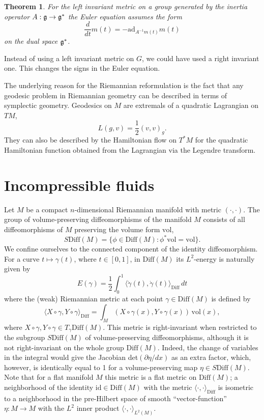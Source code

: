 \documentclass{article}
\theoremstyle{plain}
\newtheorem{teo}{Theorem}[section]
\theoremstyle{definition}
\newcommand{\Diff}{\ensuremath{\mathrm{Diff}}}
\newcommand{\Vol}{\ensuremath{\mathrm{vol}}}
\newcommand{\id}{\ensuremath{\mathrm{id}}}
\newcommand{\ad}{\ensuremath{\mathrm{ad}}}
\newcommand{\mf}{\ensuremath{\mathfrak}}
\begin{document}
\begin{teo}
For the left invariant metric on a group  generated by the inertia operator $A:\mf g\to \mf g^*$ the Euler equation assumes the form
\[
\frac{d}{dt}m(t)=-\ad_{A^{-1}m(t)}m(t)
\]
on the dual space $\mf g^*$.
\end{teo}

Instead of using a left invariant metric on $G$, we could have
used a right invariant one. This changes the signs in the Euler equation.

The underlying reason for the Riemannian reformulation is
the fact that any geodesic problem in Riemannian geometry can be described
in terms of symplectic geometry. Geodesics on $M$ are extremals of a quadratic
Lagrangian on $TM$,
\[
L(g,v)=\frac{1}{2}(v,v)_g.
\]
They can also be described by the Hamiltonian flow on $T^*M$ for the quadratic Hamiltonian function obtained from the Lagrangian via the Legendre transform.

\section{Incompressible fluids}
Let $M$ be a compact $n$-dimensional Riemannian manifold with metric $(\cdot,\cdot)$. The group of volume-preserving diffeomorphisms of the manifold $M$ consists of all diffeomorphisms of $M$ preserving the volume form $\Vol$,
\[
S\Diff(M)=\{\phi\in\Diff(M): \phi^*\Vol=\Vol\}.
\]
We confine ourselves to the connected component of the identity diffeomorphism. For a curve $t\mapsto \gamma(t)$, where $t\in[0,1]$, in $\Diff(M)$ its $L^2$-energy is naturally given by
\[
  E(\gamma)=\frac{1}{2}\int_0^1\langle \dot{\gamma}(t),\dot{\gamma}(t)\rangle_\Diff\,dt
\]
where the (weak) Riemannian metric at each point $\gamma\in\Diff(M)$ is defined by
%
\begin{equation}
\label{eq:weakmetric}
\langle X\circ \gamma,Y\circ \gamma\rangle_\Diff = \int_M(X\circ \gamma(x),Y\circ \gamma(x))\,\Vol(x),
\end{equation}
%
where $X\circ\gamma,Y\circ\gamma\in T_\gamma\Diff(M)$.
This metric is right-invariant when restricted to the subgroup $S\Diff(M)$ of
volume-preserving diffeomorphisms, although it is not right-invariant on the
whole group $\Diff(M)$. Indeed, the change of variables in the integral
would give the Jacobian det$(\partial \eta/dx)$ as an extra factor, which, however, is identically equal to 1 for a volume-preserving map $\eta\in S\Diff(M)$. Note that for a flat manifold $M$ this metric is a flat metric on $\Diff(M)$; a neighborhood of the identity $\id\in\Diff(M)$ with the metric $\langle\cdot,\cdot\rangle_\Diff$ is isometric to a neighborhood in the pre-Hilbert space of smooth ``vector-function'' $\eta:M\to M$ with the $L^2$ inner product $\langle\cdot,\cdot\rangle_{L^2(M)}$.
\end{document}
